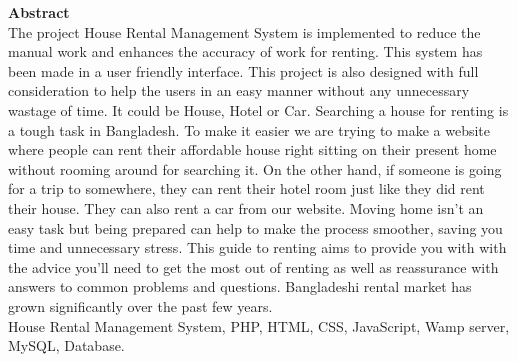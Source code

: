 \documentclass[12pt,a4paper]{article}
\newcommand{\zh}[1]{\begin{CJK}{UTF8}{gbsn}#1\end{CJK}}
\newcommand\tab[1][.7cm]{\hspace*{#1}}
\begin{document}
	\begin{titlepage}
	\vspace*{.05cm}	
		\thispagestyle{fancy}
		\centering 
		{\fontsize{16}{10}\selectfont \textbf{Abstract}}\\
		\vspace{0.6cm}
		\justify \tab  The project House Rental Management System is implemented to reduce the
manual work and enhances the accuracy of work for renting. This system has been made
in a user friendly interface. This project is also designed with full consideration to help the
users in an easy manner without any unnecessary wastage of time. It could be House, Hotel or Car. Searching a house for renting is a
tough task in Bangladesh. To make it easier we are trying to make a website where people can rent
their affordable house right sitting on their present home without rooming around for searching it.
On the other hand, if someone is going for a trip to somewhere, they can rent their hotel room just
like they did rent their house. They can also rent a car from our website.
Moving home isn’t an easy task but being prepared can help to make the process smoother,
saving you time and unnecessary stress.
This guide to renting aims to provide you with with the advice you’ll need to get the most out of renting
as well as reassurance with answers to common problems and questions. Bangladeshi rental market
has grown significantly over the past few years.\\

 House Rental Management System, PHP, HTML, CSS, JavaScript, Wamp server, MySQL, Database.
%	
%
	\end{titlepage}
	\thispagestyle{fancy}
	\setcounter{page}{2}
	\tableofcontents\thispagestyle{fancy}
	\listoffigures\thispagestyle{fancy}
	\listoftables\thispagestyle{fancy}
		\newpage	
\end{document}

